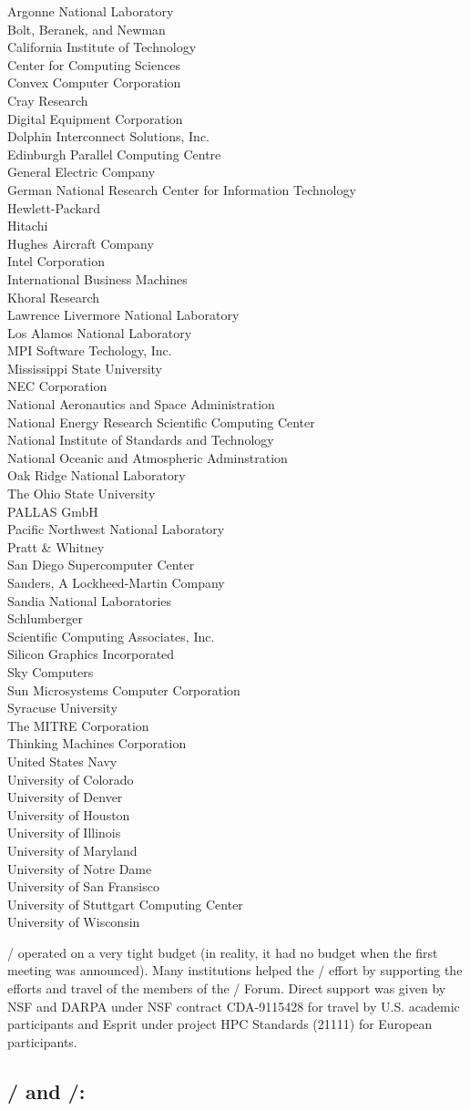 \begin{obeylines}
Argonne National Laboratory
Bolt, Beranek, and Newman
California Institute of Technology
Center for Computing Sciences
Convex Computer Corporation
Cray Research
Digital Equipment Corporation
Dolphin Interconnect Solutions, Inc.
Edinburgh Parallel Computing Centre
General Electric Company
German National Research Center for Information Technology
Hewlett-Packard
Hitachi
Hughes Aircraft Company
Intel Corporation
International Business Machines
Khoral Research
Lawrence Livermore National Laboratory
Los Alamos National Laboratory
MPI Software Techology, Inc.
Mississippi State University
NEC Corporation
National Aeronautics and Space Administration
National Energy Research Scientific Computing Center
National Institute of Standards and Technology
National Oceanic and Atmospheric Adminstration
Oak Ridge National Laboratory
The Ohio State University
PALLAS GmbH
Pacific Northwest National Laboratory
Pratt \& Whitney
San Diego Supercomputer Center
Sanders, A Lockheed-Martin Company
Sandia National Laboratories
Schlumberger
Scientific Computing Associates, Inc.
Silicon Graphics Incorporated
Sky Computers
Sun Microsystems Computer Corporation
Syracuse University
The MITRE Corporation
Thinking Machines Corporation
United States Navy
University of Colorado
University of Denver
University of Houston
University of Illinois
University of Maryland
University of Notre Dame
University of San Fransisco
University of Stuttgart Computing Center
University of Wisconsin
\end{obeylines}

\medskip

\MPIII/ operated on a very tight budget (in reality, it had no budget when
the first meeting was announced).  Many institutions helped the
\MPIII/ effort by supporting the efforts and travel of the members of
the \MPI/ Forum.  Direct support was given by NSF and DARPA under NSF
contract CDA-9115428 for travel by U.S. academic participants and
Esprit under project HPC Standards (21111) for European participants.

\medskip

\subsection*{\MPIIDOTIII/ and \MPIIIDOTI/:} 
 
